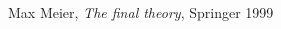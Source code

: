 \begin{thebibliography}{99}

 Max Meier, \textsl{The final theory}, Springer 1999

\end{thebibliography}
